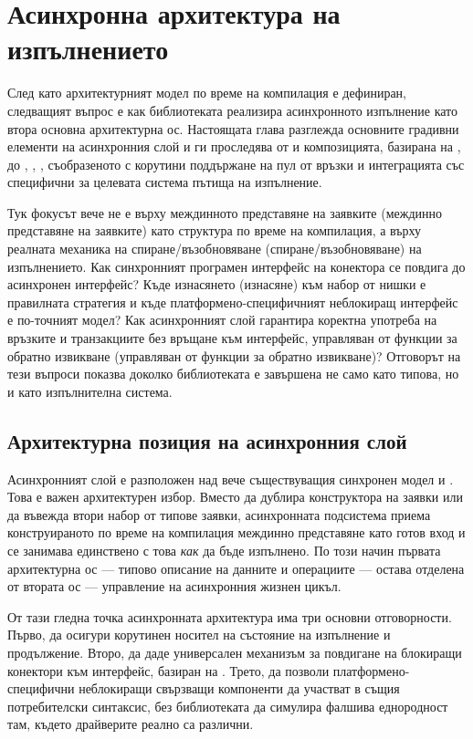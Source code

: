 \section{Асинхронна архитектура на изпълнението}
\label{sec:async_execution_architecture}

След като архитектурният модел по време на компилация е дефиниран, следващият въпрос е как библиотеката реализира асинхронното изпълнение като втора основна архитектурна ос. Настоящата глава разглежда основните градивни елементи на асинхронния слой и ги проследява от  и композицията, базирана на , до , , , съобразеното с корутини поддържане на пул от връзки и интеграцията със специфични за целевата система пътища на изпълнение.

Тук фокусът вече не е върху междинното представяне на заявките (междинно представяне на заявките) като структура по време на компилация, а върху реалната механика на спиране/възобновяване (спиране/възобновяване) на изпълнението. Как синхронният програмен интерфейс на конектора се повдига до асинхронен интерфейс? Къде изнасянето (изнасяне) към набор от нишки е правилната стратегия и къде платформено-специфичният неблокиращ интерфейс е по-точният модел? Как асинхронният слой гарантира коректна употреба на връзките и транзакциите без връщане към интерфейс, управляван от функции за обратно извикване (управляван от функции за обратно извикване)? Отговорът на тези въпроси показва доколко библиотеката е завършена не само като типова, но и като изпълнителна система.

\subsection{Архитектурна позиция на асинхронния слой}

Асинхронният слой е разположен над вече съществуващия синхронен модел  и . Това е важен архитектурен избор. Вместо да дублира конструктора на заявки или да въвежда втори набор от типове заявки, асинхронната подсистема приема конструираното по време на компилация междинно представяне като готов вход и се занимава единствено с това \emph{как} да бъде изпълнено. По този начин първата архитектурна ос --- типово описание на данните и операциите --- остава отделена от втората ос --- управление на асинхронния жизнен цикъл.

От тази гледна точка асинхронната архитектура има три основни отговорности. Първо, да осигури корутинен носител на състояние на изпълнение и продължение. Второ, да даде универсален механизъм за повдигане на блокиращи конектори към интерфейс, базиран на . Трето, да позволи платформено-специфични неблокиращи свързващи компоненти да участват в същия потребителски синтаксис, без библиотеката да симулира фалшива еднородност там, където драйверите реално са различни.

